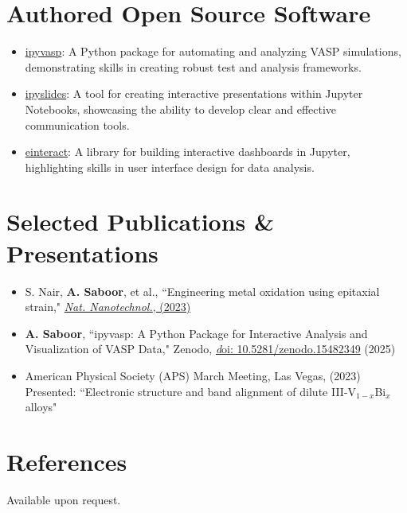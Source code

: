 \documentclass[letter,11pt]{article}
\begin{document}
\section{Authored Open Source Software}
\begin{itemize}
    \item \href{https://github.com/asaboor-gh/ipyvasp}{ipyvasp}: A Python package for automating and analyzing VASP simulations, demonstrating skills in creating robust test and analysis frameworks.
    \item \href{https://github.com/asaboor-gh/ipyslides}{ipyslides}: A tool for creating interactive presentations within Jupyter Notebooks, showcasing the ability to develop clear and effective communication tools.
    \item \href{https://github.com/asaboor-gh/einteract}{einteract}: A library for building interactive dashboards in Jupyter, highlighting skills in user interface design for data analysis.
\end{itemize}

\section{Selected Publications \& Presentations}
\begin{itemize}
    \item S. Nair, \textbf{A. Saboor}, et al., ``Engineering metal oxidation using epitaxial strain," \href{https://www.nature.com/articles/s41565-023-01397-0}{\textit{Nat. Nanotechnol.}, (2023)}
    \item \textbf{A. Saboor}, ``ipyvasp: A Python Package for Interactive Analysis and Visualization of VASP Data," Zenodo, \href{https://zenodo.org/records/15482349}{\textit doi: 10.5281/zenodo.15482349} (2025)
    \item American Physical Society (APS) March Meeting, Las Vegas, (2023) \\
      Presented: ``Electronic structure and band alignment of dilute III-V$_{1-x}$Bi$_x$ alloys"
\end{itemize}

\section{References}
Available upon request.
\end{document}
